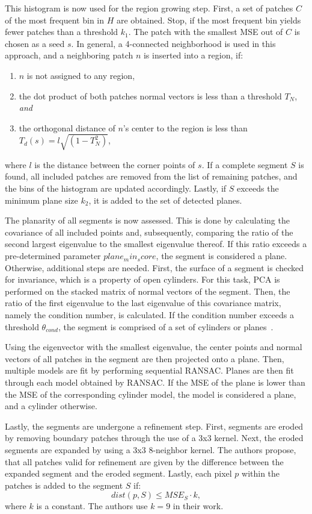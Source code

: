 \documentclass[main.tex]{subfiles}
\begin{document}
This histogram is now used for the region growing step.
First, a set of patches $C$ of the most frequent bin in $H$ are obtained. Stop, if the most frequent bin
yields fewer patches than a threshold $k_1$. The patch with the smallest MSE out of $C$ is chosen as a seed $s$.
In general, a 4-connected neighborhood is used in this approach, and a neighboring patch $n$ is inserted into a region, if:
\begin{enumerate}
    \item $n$ is not assigned to any region,
    \item the dot product of both patches normal vectors is less than a threshold $T_N$, \textit{and}
    \item the orthogonal distance of $n$'s center to the region is less than $T_d(s) = l\sqrt{(1-T_N^2)}$,
\end{enumerate}
where $l$ is the distance between the corner points of $s$.
If a complete segment $S$ is found, all included patches are removed from the list of remaining patches, and
the bins of the histogram are updated accordingly. Lastly, if $S$ exceeds the minimum plane size $k_2$, it is added
to the set of detected planes.

The planarity of all segments is now assessed. This is done by calculating the covariance of all included points and,
subsequently, comparing the ratio of the second largest eigenvalue to the smallest eigenvalue thereof. If this ratio
exceeds a pre-determined parameter $plane_min_score$, the segment is considered a plane.
Otherwise, additional steps are needed.
First, the surface of a segment is checked for invariance, which is a property of open cylinders.
For this task, PCA is performed on the stacked matrix of normal vectors of the segment.
Then, the ratio of the first eigenvalue to the last eigenvalue of this covariance matrix, namely the condition number,
is calculated. If the condition number exceeds a threshold $\theta_{cond}$, the segment is comprised of a set of
cylinders or planes~\cite[Section~III.D]{Proença_Gao_2018}.

Using the eigenvector with the smallest eigenvalue, the center points and normal vectors of all patches
in the segment are then projected onto a plane. Then, multiple models are fit by performing sequential RANSAC.
Planes are then fit through each model obtained by RANSAC. If the MSE of the plane is lower than the MSE of
the corresponding cylinder model, the model is considered a plane, and a cylinder otherwise.

Lastly, the segments are undergone a refinement step.
First, segments are eroded by removing boundary patches through the use of a 3x3 kernel. Next, the eroded segments are expanded by using
a 3x3 8-neighbor kernel. The authors propose, that all patches valid for refinement are given by the difference between
the expanded segment and the eroded segment. Lastly, each pixel $p$ within the patches is added to
the segment $S$ if:
\begin{equation}
    dist(p,S) \leq MSE_S \cdot k,
\end{equation}
where $k$ is a constant. The authors use $k=9$ in their work.
\end{document}
